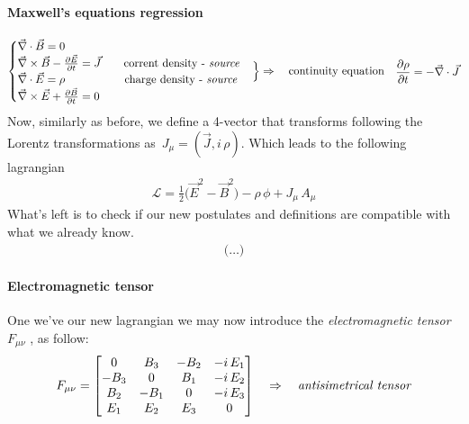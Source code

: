\documentclass[class=article]{standalone}
\begin{document}
\paragraph{Maxwell's equations regression}
\begin{equation*}
\begin{split}
\begin{cases}
\vec \nabla \cdot \vec B = 0 \\
\vec \nabla \times \vec B - \pdv{\vec E}{t} = \vec J   \quad\quad \mbox{corrent density - \emph{source}} \\
\vec \nabla \cdot \vec E = \rho   \quad\quad\quad\quad\quad \; \mbox{charge density - \emph{source}} \\
\vec \nabla \times \vec E + \pdv{\vec B}{t} = 0
\end{cases}
\end{split} 
\Big\} \Rightarrow\quad \mbox{continuity equation} \quad
\begin{split}
\pdv{ \rho}{t} = - \vec \nabla \cdot \vec J 
\end{split}
\end{equation*}
Now, similarly as before, we define a 4-vector that transforms following the Lorentz transformations as $\, J_{\mu} = (\vec J , i \, \rho) $.
Which leads to the following lagrangian
\begin{equation*}
\begin{split}
\mathcal{L} = \frac{1}{2} \Big( \vec E^2 - \vec B^2 \Big) - \rho \, \phi + J_{\mu}\,A_{\mu}
\end{split}
\end{equation*}
What's left is to check if our new postulates and definitions are compatible with what we already know.
\begin{equation*}
\begin{split}
\Big( \ldots \Big)
\end{split}
\end{equation*}

\paragraph{Electromagnetic tensor} One we've our new lagrangian we may now introduce the \emph{electromagnetic tensor} $F_{\mu\nu}$ , as follow:
\begin{equation*}
\begin{split}
F_{\mu\nu} = 
\mqty[
0 	& B_3 	& - B_2 	& - i\,E_1 \\
- B_3 & 0     	&  B_1   	& - i\,E_2 \\
B_2 	& - B_1   	&  0   	& - i\,E_3 \\
E_1	& E_2	& E_3 	& 0
]
\end{split}
\quad\Rightarrow\quad
\mbox{\emph{antisimetrical tensor}}
\end{equation*}
\end{document}
